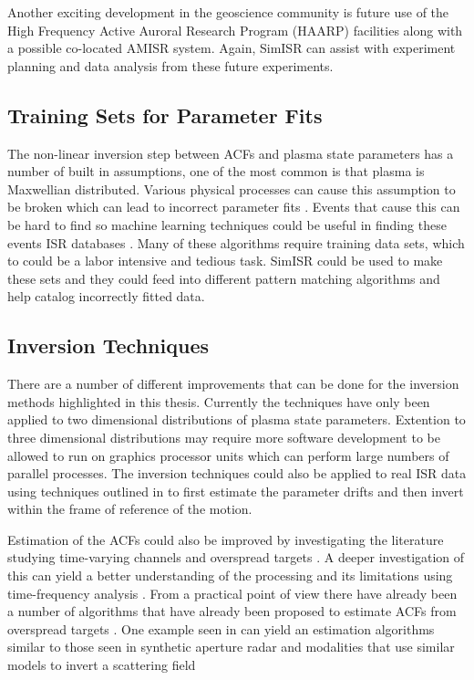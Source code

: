 Another exciting development in the geoscience community is future use of the High Frequency Active Auroral Research Program (HAARP) facilities \cite{Bernhardt:2016il} along with a possible co-located AMISR system. Again, SimISR can assist with experiment planning and data analysis from these future experiments.



\subsection{Training Sets for Parameter Fits}

The non-linear inversion step between ACFs and plasma state parameters has a number of built in assumptions, one of the most common is that plasma is Maxwellian distributed. Various physical processes can cause this assumption to be broken which can lead to incorrect parameter fits \cite{St1979ion,Suvanto1988incoherent,Akbari:2015fv}. Events that cause this can be hard to find so machine learning techniques could be useful in finding these events ISR databases \cite{Duda:2000:PC:954544}. Many of these algorithms require training data sets, which to could be a labor intensive and tedious task. SimISR could be used to make these sets and they could feed into different pattern matching algorithms and help catalog incorrectly fitted data.

\subsection{Inversion Techniques}

There are a number of different improvements that can be done for the inversion methods highlighted in this thesis. Currently the techniques have only been applied to two dimensional distributions of plasma state parameters. Extention to three dimensional distributions may require more software development to be allowed to run on graphics processor units which can perform large numbers of parallel processes. The inversion techniques could also be applied to real ISR data using techniques outlined in \cite{butler:imagingfregiondrifts} to first estimate the parameter drifts and then invert within the frame of reference of the motion.

Estimation of the ACFs could also be improved by investigating the literature studying time-varying channels and overspread targets \cite{Kailath:1962jx,Kailath:1963gh,Pfander:2006hh,Pfander:2015ea}. A deeper investigation of this can yield a better understanding of the processing and its limitations using time-frequency analysis \cite{TFAcohen,Peyrin:1986bh,Jiang:kj}. From a practical point of view there have already been a number of algorithms that have already been proposed to estimate ACFs from overspread targets \cite{Pfander:2015ea,Jiang:kj}. One example seen in \cite{Kay:2003jl} can yield an estimation algorithms similar to those seen in synthetic aperture radar and modalities that use similar models to invert a scattering field \cite{1456966,Ralston:2007hs,richards2014fundamentals}


